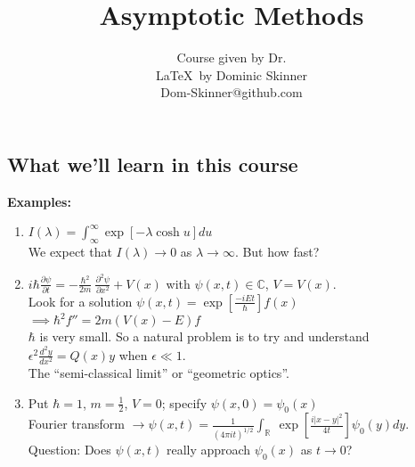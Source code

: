 \documentclass{article}
\begin{document}
\title{Asymptotic Methods}
\author{Course given by Dr.  \\
\LaTeX\  by Dominic Skinner \\
Dom-Skinner@github.com}
\maketitle
\subsection*{What we'll learn in this course}
\textbf{Examples:} 
\\
\begin{enumerate}[(1)]
\item $I(\lambda) = \int_{\infty}^{\infty} \exp[-\lambda \cosh u] du $
		\\ We expect that $I(\lambda) \to 0$ as $\lambda \to \infty$. But how fast?
\item $i \hbar \frac{\partial \psi}{\partial t} = -\frac{\hbar^2}{2m} \
		\frac{\partial ^2 \psi}{\partial x^2} + V(x)$ with $\psi(x,t) \in \mathbb{C}$,
		$V = V(x)$. \\
		Look for a solution $\psi(x,t) = \exp \left[\frac{-iEt}{\hbar} \right] f(x)$
		$\implies \hbar^2 f'' = 2m(V(x) -E)f$ 
		\\
		$\hbar$ is very small. So a natural problem is to try and understand
		$\epsilon^2 \frac{d^2y}{dx^2} = Q(x)y$ when $\epsilon \ll 1$.
		\\ The ``semi-classical limit'' or ``geometric optics''.
\item Put $\hbar = 1$, $m=\frac{1}{2}$, $V=0$; specify $\psi(x,0) = \psi_0(x)$
		\\
		Fourier transform $\to \psi(x,t) = \frac{1}{(4\pi i t)^{1/2}} \int_{\mathbb{R}} \
		\exp\left[ \frac{i|x-y|^2}{4t} \right] \psi_0(y) dy$.
		\\
		Question: Does $\psi(x,t)$ really approach $\psi_0(x)$ as $t\to0$?
\end{enumerate}
%
\end{document}
